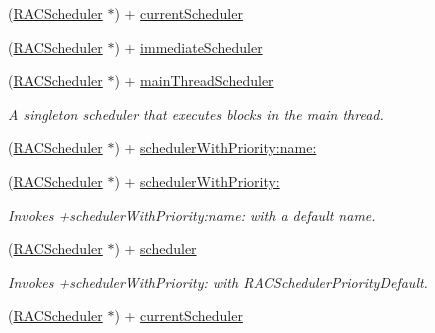 \begin{DoxyCompactItemize}
(\mbox{\hyperlink{interface_r_a_c_scheduler}{R\+A\+C\+Scheduler}} $\ast$) + \mbox{\hyperlink{interface_r_a_c_scheduler_a8019577be2939f511255ac535a6f742b}{current\+Scheduler}}
\item 
(\mbox{\hyperlink{interface_r_a_c_scheduler}{R\+A\+C\+Scheduler}} $\ast$) + \mbox{\hyperlink{interface_r_a_c_scheduler_a78433c164c6e6ca6628eef47c9c087e3}{immediate\+Scheduler}}
\item 
\mbox{\label{interface_r_a_c_scheduler_a1672712ac42bf63c524c7ae3a355bdd0}} 
(\mbox{\hyperlink{interface_r_a_c_scheduler}{R\+A\+C\+Scheduler}} $\ast$) + \mbox{\hyperlink{interface_r_a_c_scheduler_a1672712ac42bf63c524c7ae3a355bdd0}{main\+Thread\+Scheduler}}
\begin{DoxyCompactList}\small\item\em A singleton scheduler that executes blocks in the main thread. \end{DoxyCompactList}\item 
(\mbox{\hyperlink{interface_r_a_c_scheduler}{R\+A\+C\+Scheduler}} $\ast$) + \mbox{\hyperlink{interface_r_a_c_scheduler_a28259d5d6caccd1c459f85154d9aca9a}{scheduler\+With\+Priority\+:name\+:}}
\item 
\mbox{\label{interface_r_a_c_scheduler_aa50568b10bf46f6e9703afd9624224ad}} 
(\mbox{\hyperlink{interface_r_a_c_scheduler}{R\+A\+C\+Scheduler}} $\ast$) + \mbox{\hyperlink{interface_r_a_c_scheduler_aa50568b10bf46f6e9703afd9624224ad}{scheduler\+With\+Priority\+:}}
\begin{DoxyCompactList}\small\item\em Invokes +scheduler\+With\+Priority\+:name\+: with a default name. \end{DoxyCompactList}\item 
\mbox{\label{interface_r_a_c_scheduler_a51cc8cbd6c8f2239f6aa53c63f635305}} 
(\mbox{\hyperlink{interface_r_a_c_scheduler}{R\+A\+C\+Scheduler}} $\ast$) + \mbox{\hyperlink{interface_r_a_c_scheduler_a51cc8cbd6c8f2239f6aa53c63f635305}{scheduler}}
\begin{DoxyCompactList}\small\item\em Invokes +scheduler\+With\+Priority\+: with R\+A\+C\+Scheduler\+Priority\+Default. \end{DoxyCompactList}\item 
(\mbox{\hyperlink{interface_r_a_c_scheduler}{R\+A\+C\+Scheduler}} $\ast$) + \mbox{\hyperlink{interface_r_a_c_scheduler_a67734f655b47abc041b32021cf72c017}{current\+Scheduler}}

\end{DoxyCompactItemize}
